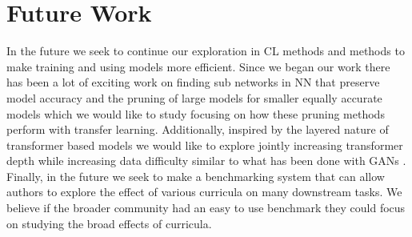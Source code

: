 \chapter{Future Work}
In the future we seek to continue our exploration in CL methods and methods to make training and using models more efficient. Since we began our work there has been a lot of exciting work on finding sub networks in NN that preserve model accuracy \cite{Frankle2019TheLT} and the pruning of large models for smaller equally accurate models \cite{Han2016DeepCC} \cite{Yu2017ScalpelCD} \cite{Wynter2020OptimalSE} which we would like to study focusing on how these pruning methods perform with transfer learning. Additionally, inspired by the layered nature of transformer based models we would like to explore jointly increasing transformer depth while increasing data difficulty similar to what has been done with GANs \cite{Karras2017ProgressiveGO}. Finally, in the future we seek to make a benchmarking system that can allow authors to explore the effect of various curricula on many downstream tasks. We believe if the broader community had an easy to use benchmark they could focus on studying the broad effects of curricula. 